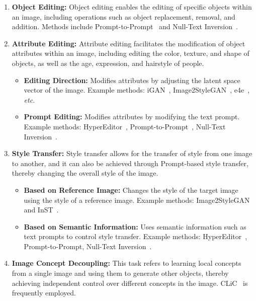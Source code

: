 \begin{enumerate}[leftmargin=*,topsep=0pt,itemsep=0pt,align=left]
    \item \textbf{Object Editing:} Object editing enables the editing of specific objects within an image, including operations such as object replacement, removal, and addition. Methods include Prompt-to-Prompt~\cite{p2p} and Null-Text Inversion~\cite{Null-Text}.

    \item \textbf{Attribute Editing:} Attribute editing facilitates the modification of object attributes within an image, including editing the color, texture, and shape of objects, as well as the age, expression, and hairstyle of people.
        \begin{itemize}[leftmargin=*,topsep=0pt,itemsep=0pt,align=left]
            \item \textbf{Editing Direction:} Modifies attributes by adjusting the latent space vector of the image. Example methods: iGAN~\cite{iGAN}, Image2StyleGAN~\cite{Image2StyleGAN}, e4e~\cite{e4e}, \textit{etc}.
            \item \textbf{Prompt Editing:} Modifies attributes by modifying the text prompt. Example methods: HyperEditor~\cite{HyperEditor}, Prompt-to-Prompt~\cite{p2p}, Null-Text Inversion~\cite{Null-Text}.
        \end{itemize}

    \item \textbf{Style Transfer:} Style transfer allows for the transfer of style from one image to another, and it can also be achieved through Prompt-based style transfer, thereby changing the overall style of the image.
        \begin{itemize}[leftmargin=*,topsep=0pt,itemsep=0pt,align=left]
            \item \textbf{Based on Reference Image:} Changes the style of the target image using the style of a reference image. Example methods: Image2StyleGAN~\cite{Image2StyleGAN} and InST~\cite{InST}.
            \item \textbf{Based on Semantic Information:} Uses semantic information such as text prompts to control style transfer. Example methods: HyperEditor~\cite{HyperEditor}, Prompt-to-Prompt\cite{p2p}, Null-Text Inversion~\cite{Null-Text}.
        \end{itemize}

    \item \textbf{Image Concept Decoupling:} This task refers to learning local concepts from a single image and using them to generate other objects, thereby achieving independent control over different concepts in the image. CLiC~\cite{CLiC} is frequently employed.


\end{enumerate}
